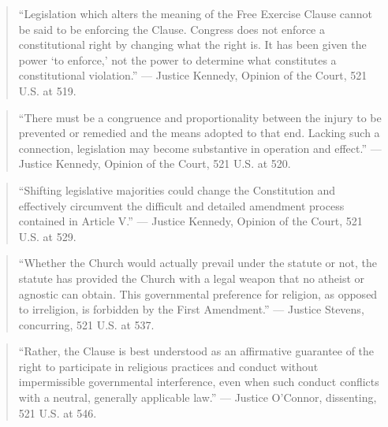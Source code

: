 \documentclass[12pt]{article}
\begin{document}
\begin{quote}
``Legislation which alters the meaning of the Free Exercise Clause cannot be said to be enforcing the Clause. Congress does not enforce a constitutional right by changing what the right is. It has been given the power `to enforce,' not the power to determine what constitutes a constitutional violation.'' --- Justice Kennedy, Opinion of the Court, 521 U.S. at 519.
\end{quote}

\begin{quote}
``There must be a congruence and proportionality between the injury to be prevented or remedied and the means adopted to that end. Lacking such a connection, legislation may become substantive in operation and effect.'' --- Justice Kennedy, Opinion of the Court, 521 U.S. at 520.
\end{quote}

\begin{quote}
``Shifting legislative majorities could change the Constitution and effectively circumvent the difficult and detailed amendment process contained in Article V.'' --- Justice Kennedy, Opinion of the Court, 521 U.S. at 529.
\end{quote}

\begin{quote}
``Whether the Church would actually prevail under the statute or not, the statute has provided the Church with a legal weapon that no atheist or agnostic can obtain. This governmental preference for religion, as opposed to irreligion, is forbidden by the First Amendment.'' --- Justice Stevens, concurring, 521 U.S. at 537.
\end{quote}

\begin{quote}
``Rather, the Clause is best understood as an affirmative guarantee of the right to participate in religious practices and conduct without impermissible governmental interference, even when such conduct conflicts with a neutral, generally applicable law.'' --- Justice O'Connor, dissenting, 521 U.S. at 546.
\end{quote}
\end{document}

